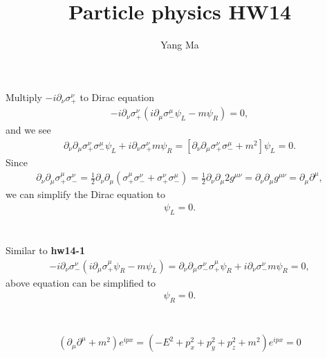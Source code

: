 \documentclass[11pt]{article}
\def\del{{\partial}}
\begin{document}
\title{Particle physics HW14}
\author{Yang Ma}

\maketitle

\section{ }
Multiply $-i\del_\nu \sigma_+^\nu$ to Dirac equation
\begin{eqnarray}
    -i\del_\nu \sigma_+^\nu( i\del_\mu \sigma_-^\mu \psi_L - m \psi_R) = 0,
\end{eqnarray}
and we see
\begin{eqnarray}
    \del_\nu \del_\mu \sigma_+^\nu \sigma_-^\mu \psi_L
  +i\del_\nu \sigma_+^\nu m \psi_R= [\del_\nu \del_\mu \sigma_+^\nu \sigma_-^\mu + m^2] \psi_L = 0.
\end{eqnarray}
Since
\begin{eqnarray}
    \del_\nu \del_\mu \sigma_+^\mu \sigma_-^\nu
    = \frac{1}{2} \del_\nu \del_\mu
      (\sigma_+^\mu \sigma_-^\nu + \sigma_+^\nu \sigma_-^\mu)
    = \frac{1}{2} \del_\nu \del_\mu { 2 g^{\mu\nu} }
    = \del_\nu \del_\mu g^{\mu\nu}
    = \del_\mu \del^\mu,
  \end{eqnarray}
we can simplify the Dirac equation to
\begin{eqnarray}
    [ \del_\mu \del^\mu + m^2 ] \psi_L = 0.
\end{eqnarray}

\section{ }
Similar to {\bf hw14-1}
\begin{eqnarray}
    -i\del_\nu \sigma_-^\nu( i\del_\mu \sigma_+^\mu \psi_R - m \psi_L) =\del_\nu \del_\mu \sigma_-^\nu \sigma_+^\mu \psi_R
    +i\del_\nu \sigma_-^\nu m \psi_R = 0,
\end{eqnarray}
above equation can be simplified to
\begin{eqnarray}
    [ \del_\mu \del^\mu + m^2 ] \psi_R = 0.
\end{eqnarray}

\section{ }
\begin{eqnarray}
    (\del_\mu\del^\mu+m^2) e^{ipx}=(-E^2+p_x^2+p_y^2+p_z^2+m^2)e^{ipx}=0
\end{eqnarray}
\end{document}
